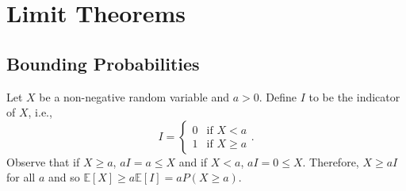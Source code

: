 \documentclass[math]{amznotes}
\theoremstyle{remark}
\newcommand{\0}{\mathbf{0}}
\newcommand{\1}{\mathbf{1}}
\begin{document}
\chapter{Limit Theorems}
\section{Bounding Probabilities}
Let $X$ be a non-negative random variable and $a > 0$. Define $I$ to be the indicator of $X$, i.e.,
\begin{equation*}
    I = \begin{cases}
        0 & \textrm{if } X < a \\
        1 & \textrm{if } X \geq a
    \end{cases}.
\end{equation*}
Observe that if $X \geq a$, $aI = a \leq X$ and if $X < a$, $aI = 0 \leq X$. Therefore, $X \geq aI$ for all $a$ and so $\mathbb{E}[X] \geq a\mathbb{E}[I] = aP(X \geq a)$.
\end{document}
